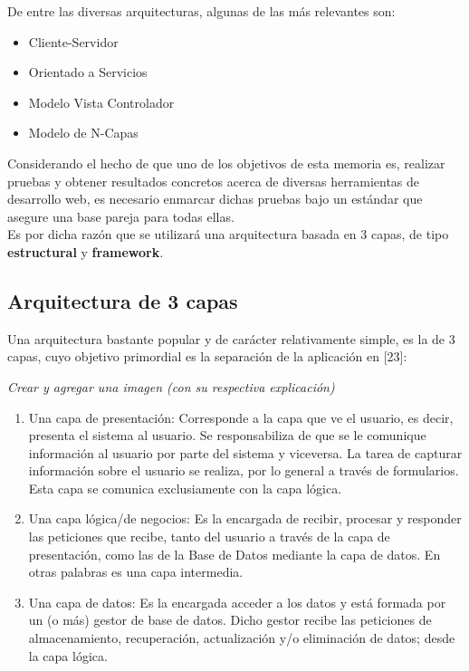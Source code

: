 De entre las diversas arquitecturas, algunas de las más relevantes son:
\begin{itemize}
 \item Cliente-Servidor
 \item Orientado a Servicios
 \item Modelo Vista Controlador
 \item Modelo de N-Capas
\end{itemize}




Considerando el hecho de que uno de los objetivos de esta memoria es, realizar pruebas y obtener
resultados concretos acerca de diversas herramientas de desarrollo web, es necesario enmarcar
dichas pruebas bajo un estándar que asegure una base pareja para todas ellas.\\

Es por dicha razón que se utilizará una arquitectura basada en 3 capas, de tipo \textbf{estructural} y 
\textbf{framework}.\\

\subsection{Arquitectura de 3 capas}
Una arquitectura bastante popular y de carácter relativamente simple, es la de 3 capas, cuyo
objetivo primordial es la separación de la aplicación en [23]:

\textit{Crear y agregar una imagen (con su respectiva explicación)}\\

\begin{enumerate}
 \item Una capa de presentación: Corresponde a la capa que ve el usuario, es decir, presenta 
  el sistema al usuario. Se responsabiliza de que se le comunique información al usuario por 
  parte del sistema y viceversa. La tarea de capturar información sobre el usuario se realiza,
  por lo general a través de formularios. Esta capa se comunica exclusiamente con la capa lógica.
  
 \item Una capa lógica/de negocios: Es la encargada de recibir, procesar y responder las peticiones
  que recibe, tanto del usuario a través de la capa de presentación, como las de la Base de Datos mediante
  la capa de datos. En otras palabras es una capa intermedia.
 
 \item Una capa de datos: Es la encargada acceder a los datos y está formada por un (o más) gestor de 
  base de datos. Dicho gestor recibe las peticiones de almacenamiento, recuperación, actualización y/o 
  eliminación de datos; desde la capa lógica. 
\end{enumerate}

